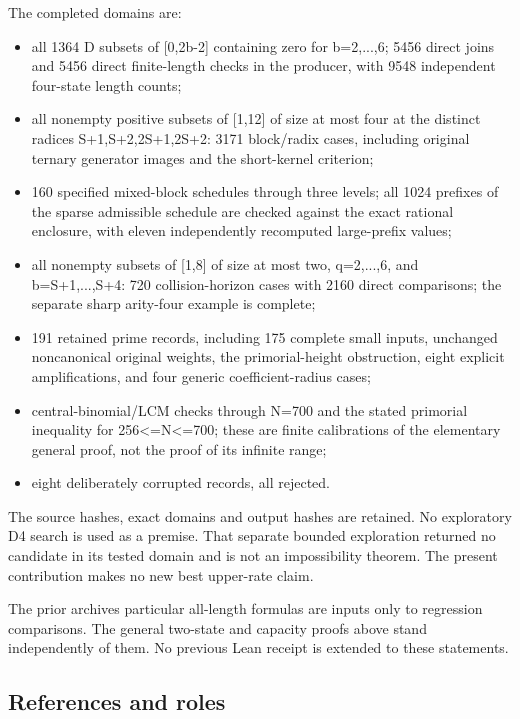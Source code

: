 The completed domains are:

\begin{itemize}
\tightlist
\item
  all 1364 D subsets of {[}0,2b-2{]} containing zero for b=2,...,6; 5456 direct joins and 5456 direct finite-length checks in the producer, with 9548 independent four-state length counts;
\item
  all nonempty positive subsets of {[}1,12{]} of size at most four at the distinct radices S+1,S+2,2S+1,2S+2: 3171 block/radix cases, including original ternary generator images and the short-kernel criterion;
\item
  160 specified mixed-block schedules through three levels; all 1024 prefixes of the sparse admissible schedule are checked against the exact rational enclosure, with eleven independently recomputed large-prefix values;
\item
  all nonempty subsets of {[}1,8{]} of size at most two, q=2,...,6, and b=S+1,...,S+4: 720 collision-horizon cases with 2160 direct comparisons; the separate sharp arity-four example is complete;
\item
  191 retained prime records, including 175 complete small inputs, unchanged noncanonical original weights, the primorial-height obstruction, eight explicit amplifications, and four generic coefficient-radius cases;
\item
  central-binomial/LCM checks through N=700 and the stated primorial inequality for 256\textless=N\textless=700; these are finite calibrations of the elementary general proof, not the proof of its infinite range;
\item
  eight deliberately corrupted records, all rejected.
\end{itemize}

The source hashes, exact domains and output hashes are retained. No exploratory D4 search is used as a premise. That separate bounded exploration returned no candidate in its tested domain and is not an impossibility theorem. The present contribution makes no new best upper-rate claim.

The prior archive\textquotesingle s particular all-length formulas are inputs only to regression comparisons. The general two-state and capacity proofs above stand independently of them. No previous Lean receipt is extended to these statements.

\subsection{References and roles}\label{n22-references-and-roles}

